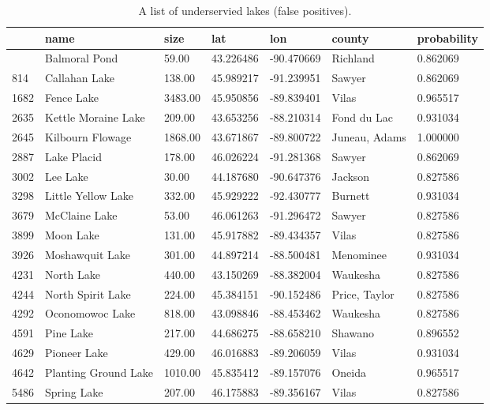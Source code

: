\documentclass[
]{article}
\begin{document}
\begin{longtable}[]{@{}lllllll@{}}

\caption{\label{tbl-underserviced-lakes}A list of underservied lakes
(false positives).}

\tabularnewline

\toprule\noalign{}
& name & size & lat & lon & county & probability \\
\midrule\noalign{}
\endhead
\bottomrule\noalign{}
\endlastfoot
153 & Balmoral Pond & 59.00 & 43.226486 & -90.470669 & Richland &
0.862069 \\
814 & Callahan Lake & 138.00 & 45.989217 & -91.239951 & Sawyer &
0.862069 \\
1682 & Fence Lake & 3483.00 & 45.950856 & -89.839401 & Vilas &
0.965517 \\
2635 & Kettle Moraine Lake & 209.00 & 43.653256 & -88.210314 & Fond du
Lac & 0.931034 \\
2645 & Kilbourn Flowage & 1868.00 & 43.671867 & -89.800722 & Juneau,
Adams & 1.000000 \\
2887 & Lake Placid & 178.00 & 46.026224 & -91.281368 & Sawyer &
0.862069 \\
3002 & Lee Lake & 30.00 & 44.187680 & -90.647376 & Jackson & 0.827586 \\
3298 & Little Yellow Lake & 332.00 & 45.929222 & -92.430777 & Burnett &
0.931034 \\
3679 & McClaine Lake & 53.00 & 46.061263 & -91.296472 & Sawyer &
0.827586 \\
3899 & Moon Lake & 131.00 & 45.917882 & -89.434357 & Vilas & 0.827586 \\
3926 & Moshawquit Lake & 301.00 & 44.897214 & -88.500481 & Menominee &
0.931034 \\
4231 & North Lake & 440.00 & 43.150269 & -88.382004 & Waukesha &
0.827586 \\
4244 & North Spirit Lake & 224.00 & 45.384151 & -90.152486 & Price,
Taylor & 0.827586 \\
4292 & Oconomowoc Lake & 818.00 & 43.098846 & -88.453462 & Waukesha &
0.827586 \\
4591 & Pine Lake & 217.00 & 44.686275 & -88.658210 & Shawano &
0.896552 \\
4629 & Pioneer Lake & 429.00 & 46.016883 & -89.206059 & Vilas &
0.931034 \\
4642 & Planting Ground Lake & 1010.00 & 45.835412 & -89.157076 & Oneida
& 0.965517 \\
5486 & Spring Lake & 207.00 & 46.175883 & -89.356167 & Vilas &
0.827586 \\

\end{longtable}
\end{document}
